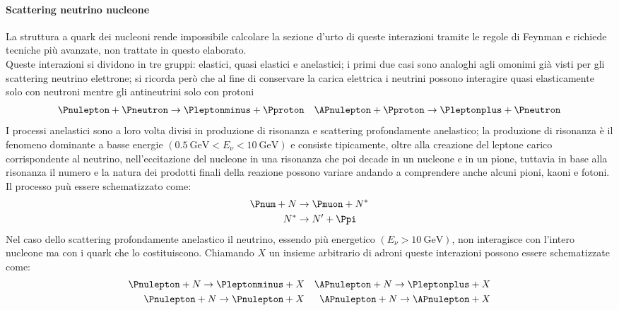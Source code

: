 \documentclass[../../main.tex]{subfiles}
\begin{document}
  \paragraph{Scattering neutrino nucleone}
    La struttura a quark dei nucleoni rende impossibile calcolare la sezione
    d'urto di queste interazioni tramite le regole di Feynman e richiede
    tecniche più avanzate, non trattate in questo elaborato.\\
    Queste interazioni si dividono in tre gruppi: elastici, quasi elastici e
    anelastici; i primi due casi sono analoghi agli omonimi già visti per gli
    scattering neutrino elettrone; si ricorda però che al fine di conservare la
    carica elettrica i neutrini possono interagire quasi elasticamente solo con
    neutroni mentre gli antineutrini solo con protoni
    \begin{align*}
      \Pnulepton + \Pneutron \rightarrow \Pleptonminus + \Pproton &&
      \APnulepton + \Pproton \rightarrow \Pleptonplus + \Pneutron
    \end{align*}
    I processi anelastici sono a loro volta divisi in produzione di risonanza e
    scattering profondamente anelastico; la produzione di risonanza è il
    fenomeno dominante a basse energie
    $\left(0.5\: \text{GeV} < E_\nu < 10\: \text{GeV} \right)$
    e consiste tipicamente, oltre alla creazione del leptone
    carico corrispondente al neutrino, nell'eccitazione del nucleone in una
    risonanza che poi decade in un nucleone e in un pione, tuttavia in base alla
    risonanza il numero e la natura dei prodotti finali della reazione possono
    variare andando a comprendere anche alcuni pioni, kaoni e fotoni.
    Il processo puù essere schematizzato come:
    \begin{align*}
      \Pnum + N &\rightarrow \Pmuon + N^* \\
      N^* &\rightarrow N' + \Ppi
    \end{align*}
    Nel caso dello scattering profondamente anelastico il neutrino, essendo
    più energetico $\left( E_{\nu} > 10 \: \text{GeV} \right)$, non interagisce
    con l'intero nucleone ma con i quark che lo costituiscono.
    Chiamando $X$ un insieme arbitrario di adroni queste interazioni possono
    essere schematizzate come:
    \begin{align*}
      \Pnulepton + N \rightarrow \Pleptonminus + X &&
      \APnulepton + N \rightarrow \Pleptonplus + X \\
      \Pnulepton + N \rightarrow \Pnulepton + X &&
      \APnulepton + N \rightarrow \APnulepton + X
    \end{align*}
\end{document}
